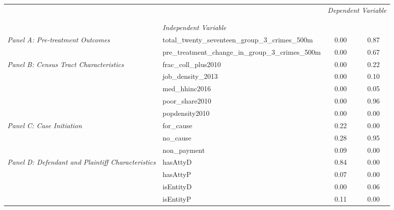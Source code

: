 \begin{tabular}{llcc}
\toprule
 &  & \multicolumn{2}{c}{\textit{Dependent Variable}} \\
\cline{3-4}
\\
 &  &  &  \\
 & \emph{Independent Variable} &  &  \\
\midrule
\multirow[c]{2}{3cm}{\textit{Panel A: Pre-treatment Outcomes}} & total_twenty_seventeen_group_3_crimes_500m & 0.00 & 0.87 \\
 & pre_treatment_change_in_group_3_crimes_500m & 0.00 & 0.67 \\
\cline{1-4}
\multirow[c]{5}{3cm}{\textit{Panel B: Census Tract Characteristics}} & frac_coll_plus2010 & 0.00 & 0.22 \\
 & job_density_2013 & 0.00 & 0.10 \\
 & med_hhinc2016 & 0.00 & 0.05 \\
 & poor_share2010 & 0.00 & 0.96 \\
 & popdensity2010 & 0.00 & 0.00 \\
\cline{1-4}
\multirow[c]{3}{3cm}{\textit{Panel C: Case Initiation}} & for_cause & 0.22 & 0.00 \\
 & no_cause & 0.28 & 0.95 \\
 & non_payment & 0.09 & 0.00 \\
\cline{1-4}
\multirow[c]{4}{3cm}{\textit{Panel D: Defendant and Plaintiff Characteristics}} & hasAttyD & 0.84 & 0.00 \\
 & hasAttyP & 0.07 & 0.00 \\
 & isEntityD & 0.00 & 0.06 \\
 & isEntityP & 0.11 & 0.00 \\
\cline{1-4}
\bottomrule
\end{tabular}
